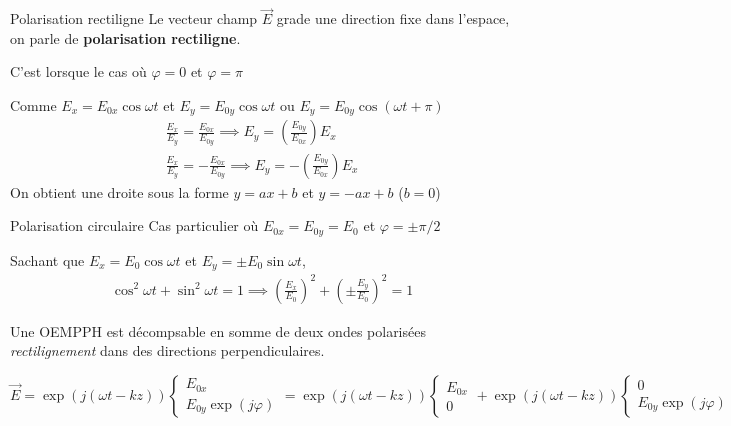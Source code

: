 \begin{Prop}{Polarisation rectiligne}{}
Le vecteur champ $\overrightarrow{E}$ grade une direction fixe dans l'espace, on parle de  \textbf{polarisation rectiligne}.

C'est lorsque le cas où $\varphi=0$ et $\varphi = \pi$
\end{Prop}

\begin{myproof} Comme $E_x = E_{0x} \cos \omega t$ et $E_y = E_{0y} \cos \omega t$ ou $E_y = E_{0y} \cos (\omega t + \pi)$
\begin{gather*}
    \frac{E_x}{E_y}  = \frac{E_{0x}}{E_{0y}}  \implies E_y = \left( \frac{E_{0y}}{E_{0x}}  \right) E_x \\
    \frac{E_x}{E_y}  = -\frac{E_{0x}}{E_{0y}}  \implies E_y = -\left( \frac{E_{0y}}{E_{0x}}  \right) E_x
\end{gather*}
On obtient une droite sous la forme $y=ax+b$ et $y = -ax+b$ ($b=0$) 
\end{myproof}

\begin{Prop}{Polarisation circulaire}{}
Cas particulier où $E_{0x} = E_{0y } = E_0$ et $\varphi = \pm \pi / 2$
\end{Prop}

\begin{myproof}
Sachant que $E_x = E_0 \cos \omega t$ et $E_y = \pm E_0 \sin \omega t$,
\begin{gather*}
\cos ^{2} \omega t + \sin ^{2} \omega t = 1 \implies \left( \frac{E_x}{E_0}  \right)  ^{2} + \left( \pm \frac{E_y}{E_0}  \right)  ^{2} = 1
\end{gather*}
\end{myproof}

Une OEMPPH est décompsable en somme de deux ondes polarisées \textit{rectilignement} dans des directions perpendiculaires.

\[
\overrightarrow{E}  = \exp(j( \omega t - kz) )\begin{cases}
    E_{0x} \\ E_{0y} \exp(j\varphi) 
\end{cases} = \exp (j ( \omega t - kz)) \begin{cases}
    E_{0x} \\ 0 
\end{cases} + \exp (j ( \omega t - kz)) \begin{cases}
    0 \\ E_{0y} \exp(j \varphi)
\end{cases}
\]

